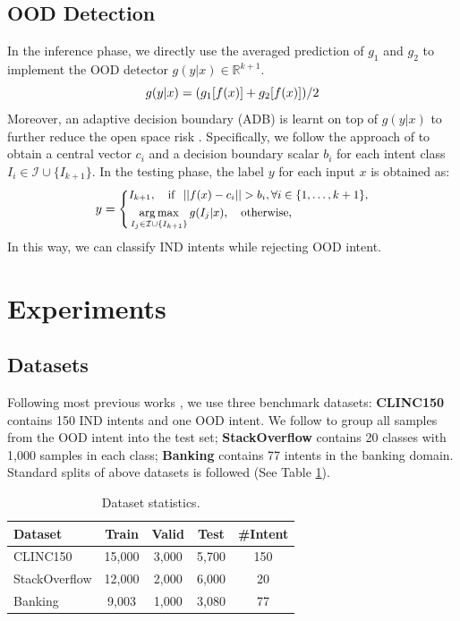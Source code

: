 \documentclass[11pt]{article}
\DeclareMathOperator*{\argmax}{arg\,max}
\begin{document}
\subsection{OOD Detection}\label{sec:adb}
In the inference phase, we directly use the averaged prediction of $g_1$ and $g_2$ to implement the OOD detector $g(y | x) \in \mathbb{R}^{k+1}$.
\begin{equation}
\small
g(y | x) = (g_1[f(x)] + g_2[f(x)]) / 2
\end{equation}
Moreover, an adaptive decision boundary (ADB) is learnt on top of $g(y|x)$ to further reduce the open space risk \citep{zhou2022knn,shu2021odist}.
Specifically, we follow the approach of \citet{zhang2021deep} to obtain a central vector $c_i$ and a decision boundary scalar $b_i$ for each intent class $I_i \in \mathcal{I} \cup \{I_{k+1}\}$.
In the testing phase, the label $y$ for each input $x$ is obtained as:
\begin{equation*}
\small
y=\left\{
\begin{aligned}
& I_{k+1}, ~~~ {\rm if} ~~ || f(x) - c_i|| > b_i,\forall{i}\in \{1, \dots ,k+1\},\\
& \argmax_{I_j\in \mathcal{I} \cup \{I_{k+1}\}} g(I_j | x), ~~~ {\rm otherwise},
\end{aligned}
\right.
\end{equation*}
In this way, we can classify IND intents while rejecting OOD intent.

\section{Experiments}
\subsection{Datasets}
Following most previous works \citep{zhang2021deep,shu2021odist}, we use three benchmark datasets: \textbf{CLINC150} \citep{larson2019evaluation} contains 150 IND intents and one OOD intent. We follow \citet{zhan2021out} to group all samples from the OOD intent into the test set; \textbf{StackOverflow} \citep{xu2015short} contains 20 classes with 1,000 samples in each class; \textbf{Banking} \citep{casanueva2020efficient} contains 77 intents in the banking domain. Standard splits of above datasets is followed (See Table \ref{tab:datasets}).

\begin{table}
\begin{center}
\small
\begin{tabular}{  l|c|c|c|c  } 
\toprule
 Dataset & Train & Valid & Test & \#Intent \\ 
\midrule
 CLINC150 & 15,000 & 3,000 & 5,700 & 150 \\ 
 StackOverflow & 12,000 & 2,000 & 6,000 & 20 \\ 
 Banking & 9,003 & 1,000 & 3,080 & 77 \\
\bottomrule
\end{tabular}
\end{center}
\caption{Dataset statistics.}
\label{tab:datasets}
\end{table}
\end{document}
